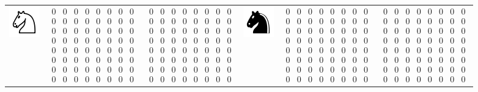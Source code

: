 \begin{table}[]
\begin{tabular}{c c c | c c c}
\includegraphics[scale=0.5]{fig/pieces/N} &
$\begin{smallmatrix}0&0&0&0&0&0&0&0\\0&0&0&0&0&0&0&0\\0&0&0&0&0&0&0&0\\0&0&0&0&0&0&0&0\\0&0&0&0&0&0&0&0\\0&0&0&0&0&0&0&0\\0&0&0&0&0&0&0&0\\0&0&0&0&0&0&0&0\end{smallmatrix}$&
$\begin{smallmatrix}0&0&0&0&0&0&0&0\\0&0&0&0&0&0&0&0\\0&0&0&0&0&0&0&0\\0&0&0&0&0&0&0&0\\0&0&0&0&0&0&0&0\\0&0&0&0&0&0&0&0\\0&0&0&0&0&0&0&0\\0&0&0&0&0&0&0&0\end{smallmatrix}$ &

\includegraphics[scale=0.5]{fig/pieces/n} &
$\begin{smallmatrix}0&0&0&0&0&0&0&0\\0&0&0&0&0&0&0&0\\0&0&0&0&0&0&0&0\\0&0&0&0&0&0&0&0\\0&0&0&0&0&0&0&0\\0&0&0&0&0&0&0&0\\0&0&0&0&0&0&0&0\\0&0&0&0&0&0&0&0\end{smallmatrix}$ &
$\begin{smallmatrix}0&0&0&0&0&0&0&0\\0&0&0&0&0&0&0&0\\0&0&0&0&0&0&0&0\\0&0&0&0&0&0&0&0\\0&0&0&0&0&0&0&0\\0&0&0&0&0&0&0&0\\0&0&0&0&0&0&0&0\\0&0&0&0&0&0&0&0\end{smallmatrix}$ \\ [1cm]


\end{tabular}
\end{table}
